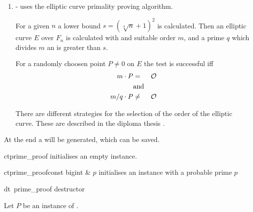 \begin{enumerate}
\item {} - uses the elliptic curve primality proving algorithm.

For a given $n$ a lower bound $s=(\sqrt[4]{n}+1)^2$ is calculated. 
Then an elliptic curve $E$ over $F_n$ is calculated with and suitable order $m$, and a prime $q$ which divides
$m$ an is greater than $s$. 

For a randomly choosen point $P\not= 0$ on $E$ the test is successful iff
\begin{eqnarray*}
m\cdot P &=& \mathcal{O}\\ %
&{\rm and}& \\
m/q \cdot P &\not=& \mathcal{O} %
\end{eqnarray*}

There are different strategies for the selection of the order of the elliptic curve.
These are described in the diploma thesis \cite{Hechler_Thesis:2003}.

\end{enumerate}
At the end a  will be generated, which can be saved.


\CONS

\begin{fcode}{ct}{prime_proof}{}
  initialises an empty instance.
\end{fcode}

\begin{fcode}{ct}{prime_proof}{const bigint &  $p$}
  initialises an instance with a probable prime $p$
\end{fcode}

\begin{fcode}{dt}{~prime_proof}{}
  destructor
\end{fcode}



\ASGN

Let $P$ be an instance of .

